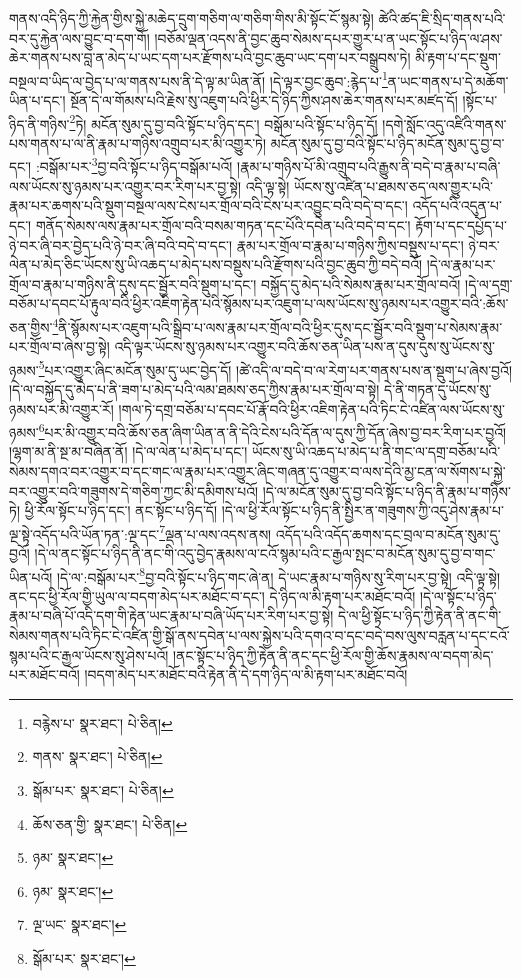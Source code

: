 གནས་འདི་ཉིད་ཀྱི་རྐྱེན་གྱིས་སྐྱེ་མཆེད་དྲུག་གཅིག་ལ་གཅིག་གིས་མི་སྟོང་ངོ་སྙམ་སྟེ། ཚེའི་ཚད་ཇི་སྲིད་གནས་པའི་བར་དུ་རྐྱེན་ལས་བྱུང་བ་དག་གོ། །བཅོམ་ལྡན་འདས་ནི་བྱང་ཆུབ་སེམས་དཔར་གྱུར་པ་ན་ཡང་སྟོང་པ་ཉིད་ལ་ཤས་ཆེར་གནས་པས་བླ་ན་མེད་པ་ཡང་དག་པར་རྫོགས་པའི་བྱང་ཆུབ་ཡང་དག་པར་བསྒྲུབས་ཏེ། མི་རྟག་པ་དང་སྡུག་བསྔལ་བ་ཡིད་ལ་བྱེད་པ་ལ་གནས་པས་ནི་དེ་ལྟ་མ་ཡིན་ནོ། །དེ་ལྟར་བྱང་ཆུབ་:རྙེད་པ་\footnote{བརྙེས་པ་  སྣར་ཐང་།  པེ་ཅིན། }ན་ཡང་གནས་པ་དེ་མཆོག་ཡིན་པ་དང་། སྔོན་དེ་ལ་གོམས་པའི་རྗེས་སུ་འཇུག་པའི་ཕྱིར་དེ་ཉིད་ཀྱིས་ཤས་ཆེར་གནས་པར་མཛད་དོ། །སྟོང་པ་ཉིད་ནི་གཉིས་\footnote{གནས་  སྣར་ཐང་།  པེ་ཅིན། }ཏེ། མངོན་སུམ་དུ་བྱ་བའི་སྟོང་པ་ཉིད་དང་། བསྒོམ་པའི་སྟོང་པ་ཉིད་དོ། །དགེ་སློང་འདུ་འཛིའི་གནས་པས་གནས་པ་ལ་ནི་རྣམ་པ་གཉིས་འགྲུབ་པར་མི་འགྱུར་ཏེ། མངོན་སུམ་དུ་བྱ་བའི་སྟོང་པ་ཉིད་མངོན་སུམ་དུ་བྱ་བ་དང་། :བསྒོམ་པར་\footnote{སྒོམ་པར་  སྣར་ཐང་།  པེ་ཅིན། }བྱ་བའི་སྟོང་པ་ཉིད་བསྒོམ་པའོ། །རྣམ་པ་གཉིས་པོ་མི་འགྲུབ་པའི་རྒྱུས་ནི་བདེ་བ་རྣམ་པ་བཞི་ལས་ཡོངས་སུ་ཉམས་པར་འགྱུར་བར་རིག་པར་བྱ་སྟེ། འདི་ལྟ་སྟེ། ཡོངས་སུ་འཛིན་པ་ཐམས་ཅད་ལས་གྱུར་པའི་རྣམ་པར་ཆགས་པའི་སྡུག་བསྔལ་ལས་ངེས་པར་གྲོལ་བའི་ངེས་པར་འབྱུང་བའི་བདེ་བ་དང་། འདོད་པའི་འདུན་པ་དང་། གནོད་སེམས་ལས་རྣམ་པར་གྲོལ་བའི་བསམ་གཏན་དང་པོའི་དབེན་པའི་བདེ་བ་དང་། རྟོག་པ་དང་དཔྱོད་པ་ཉེ་བར་ཞི་བར་བྱེད་པའི་ཉེ་བར་ཞི་བའི་བདེ་བ་དང་། རྣམ་པར་གྲོལ་བ་རྣམ་པ་གཉིས་ཀྱིས་བསྡུས་པ་དང་། ཉེ་བར་ལེན་པ་མེད་ཅིང་ཡོངས་སུ་ཡི་འཆད་པ་མེད་པས་བསྡུས་པའི་རྫོགས་པའི་བྱང་ཆུབ་ཀྱི་བདེ་བའོ། །དེ་ལ་རྣམ་པར་གྲོལ་བ་རྣམ་པ་གཉིས་ནི་དུས་དང་སྦྱོར་བའི་སྡུག་པ་དང་། བསྐྱོད་དུ་མེད་པའི་སེམས་རྣམ་པར་གྲོལ་བའོ། །དེ་ལ་དགྲ་བཅོམ་པ་དབང་པོ་རྟུལ་བའི་ཕྱིར་འཇིག་རྟེན་པའི་སྙོམས་པར་འཇུག་པ་ལས་ཡོངས་སུ་ཉམས་པར་འགྱུར་བའི་:ཆོས་ཅན་གྱིས་\footnote{ཆོས་ཅན་གྱི་  སྣར་ཐང་།  པེ་ཅིན། }ནི་སྙོམས་པར་འཇུག་པའི་སྒྲིབ་པ་ལས་རྣམ་པར་གྲོལ་བའི་ཕྱིར་དུས་དང་སྦྱོར་བའི་སྡུག་པ་སེམས་རྣམ་པར་གྲོལ་བ་ཞེས་བྱ་སྟེ། འདི་ལྟར་ཡོངས་སུ་ཉམས་པར་འགྱུར་བའི་ཆོས་ཅན་ཡིན་པས་ན་དུས་དུས་སུ་ཡོངས་སུ་ཉམས་\footnote{ཉམ་  སྣར་ཐང་། }པར་འགྱུར་ཞིང་མངོན་སུམ་དུ་ཡང་བྱེད་དོ། །ཚེ་འདི་ལ་བདེ་བ་ལ་རེག་པར་གནས་པས་ན་སྡུག་པ་ཞེས་བྱའོ། །དེ་ལ་བསྐྱོད་དུ་མེད་པ་ནི་ཟག་པ་མེད་པའི་ལམ་ཐམས་ཅད་ཀྱིས་རྣམ་པར་གྲོལ་བ་སྟེ། དེ་ནི་གཏན་དུ་ཡོངས་སུ་ཉམས་པར་མི་འགྱུར་རོ། །གལ་ཏེ་དགྲ་བཅོམ་པ་དབང་པོ་རྣོ་བའི་ཕྱིར་འཇིག་རྟེན་པའི་ཏིང་ངེ་འཛིན་ལས་ཡོངས་སུ་ཉམས་\footnote{ཉམ་  སྣར་ཐང་། }པར་མི་འགྱུར་བའི་ཆོས་ཅན་ཞིག་ཡིན་ན་ནི་དེའི་ངེས་པའི་དོན་ལ་དུས་ཀྱི་དོན་ཞེས་བྱ་བར་རིག་པར་བྱའོ། །ལྷག་མ་ནི་སྔ་མ་བཞིན་ནོ། །དེ་ལ་ལེན་པ་མེད་པ་དང་། ཡོངས་སུ་ཡི་འཆད་པ་མེད་པ་ནི་གང་ལ་དགྲ་བཅོམ་པའི་སེམས་དགའ་བར་འགྱུར་བ་དང་གང་ལ་རྣམ་པར་འགྱུར་ཞིང་གཞན་དུ་འགྱུར་བ་ལས་དེའི་མྱ་ངན་ལ་སོགས་པ་སྐྱེ་བར་འགྱུར་བའི་གཟུགས་དེ་གཅིག་ཀྱང་མི་དམིགས་པའོ། །དེ་ལ་མངོན་སུམ་དུ་བྱ་བའི་སྟོང་པ་ཉིད་ནི་རྣམ་པ་གཉིས་ཏེ། ཕྱི་རོལ་སྟོང་པ་ཉིད་དང་། ནང་སྟོང་པ་ཉིད་དོ། །དེ་ལ་ཕྱི་རོལ་སྟོང་པ་ཉིད་ནི་སྤྱིར་ན་གཟུགས་ཀྱི་འདུ་ཤེས་རྣམ་པ་ལྔ་སྟེ་འདོད་པའི་ཡོན་ཏན་:ལྔ་དང་\footnote{ལྔ་ཡང་  སྣར་ཐང་། }ལྡན་པ་ལས་འདས་ནས། འདོད་པའི་འདོད་ཆགས་དང་བྲལ་བ་མངོན་སུམ་དུ་བྱའོ། །དེ་ལ་ནང་སྟོང་པ་ཉིད་ནི་ནང་གི་འདུ་བྱེད་རྣམས་ལ་ངའོ་སྙམ་པའི་ང་རྒྱལ་སྤང་བ་མངོན་སུམ་དུ་བྱ་བ་གང་ཡིན་པའོ། །དེ་ལ་:བསྒོམ་པར་\footnote{སྒོམ་པར་  སྣར་ཐང་། }བྱ་བའི་སྟོང་པ་ཉིད་གང་ཞེ་ན། དེ་ཡང་རྣམ་པ་གཉིས་སུ་རིག་པར་བྱ་སྟེ། འདི་ལྟ་སྟེ། ནང་དང་ཕྱི་རོལ་གྱི་ཡུལ་ལ་བདག་མེད་པར་མཐོང་བ་དང་། དེ་ཉིད་ལ་མི་རྟག་པར་མཐོང་བའོ། །དེ་ལ་སྟོང་པ་ཉིད་རྣམ་པ་བཞི་པོ་འདི་དག་གི་རྟེན་ཡང་རྣམ་པ་བཞི་ཡོད་པར་རིག་པར་བྱ་སྟེ། དེ་ལ་ཕྱི་སྟོང་པ་ཉིད་ཀྱི་རྟེན་ནི་ནང་གི་སེམས་གནས་པའི་ཏིང་ངེ་འཛིན་གྱི་སྒོ་ནས་དབེན་པ་ལས་སྐྱེས་པའི་དགའ་བ་དང་བདེ་བས་ལུས་བརླན་པ་དང་ངའོ་སྙམ་པའི་ང་རྒྱལ་ཡོངས་སུ་ཤེས་པའོ། །ནང་སྟོང་པ་ཉིད་ཀྱི་རྟེན་ནི་ནང་དང་ཕྱི་རོལ་གྱི་ཆོས་རྣམས་ལ་བདག་མེད་པར་མཐོང་བའོ། །བདག་མེད་པར་མཐོང་བའི་རྟེན་ནི་དེ་དག་ཉིད་ལ་མི་རྟག་པར་མཐོང་བའོ། 